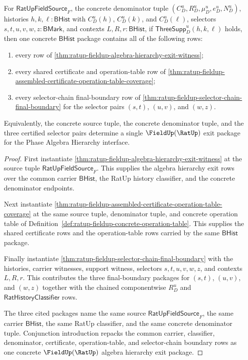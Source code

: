 \begin{theorem}
\label{thm:ratup-fieldup-algebra-hierarchy-selector-chain-exit}
For $\mathsf{RatUpFieldSource}_F$, the concrete denominator tuple
$(C_D^u,R_D^u,\mu_D^u,e_D^u,N_D^u)$, histories
$h,k,\ell:\mathsf{BHist}$ with $C_D^u(h)$, $C_D^u(k)$, and $C_D^u(\ell)$,
selectors $s,t,u,v,w,z:\mathsf{BMark}$, and contexts
$L,R,r:\mathsf{BHist}$, if $\mathsf{ThreeSupp}_D^u(h,k,\ell)$ holds, then one
concrete $\mathsf{BHist}$ package contains all of the following rows:
\begin{enumerate}
  \item every row of
  \autoref{thm:ratup-fieldup-algebra-hierarchy-exit-witness};
  \item every shared certificate and operation-table row of
  \autoref{thm:ratup-fieldup-assembled-certificate-operation-table-coverage};
  \item every selector-chain final-boundary row of
  \autoref{thm:ratup-fieldup-selector-chain-final-boundary} for the selector
  pairs $(s,t)$, $(u,v)$, and $(w,z)$.
\end{enumerate}
Equivalently, the concrete source tuple, the concrete denominator tuple, and
the three certified selector pairs determine a single
$\FieldUp(\RatUp)$ exit package for the Phase Algebra Hierarchy interface.
\end{theorem}
\begin{proof}
First instantiate
\autoref{thm:ratup-fieldup-algebra-hierarchy-exit-witness} at the source tuple
$\mathsf{RatUpFieldSource}_F$. This supplies the algebra hierarchy exit rows
over the common carrier $\mathsf{BHist}$, the RatUp history classifier, and the
concrete denominator endpoints.

Next instantiate
\autoref{thm:ratup-fieldup-assembled-certificate-operation-table-coverage} at
the same source tuple, denominator tuple, and concrete operation table of
Definition~\ref{def:ratup-fieldup-concrete-operation-table}. This supplies the
shared certificate rows and the operation-table rows carried by the same
$\mathsf{BHist}$ package.

Finally instantiate \autoref{thm:ratup-fieldup-selector-chain-final-boundary}
with the histories, carrier witnesses, support witness, selectors
$s,t,u,v,w,z$, and contexts $L,R,r$. This contributes the three final-boundary
packages for $(s,t)$, $(u,v)$, and $(w,z)$ together with the chained
componentwise $R_D^u$ and $\mathsf{RatHistoryClassifier}$ rows.

The three cited packages name the same source
$\mathsf{RatUpFieldSource}_F$, the same carrier $\mathsf{BHist}$, the same
RatUp classifier, and the same concrete denominator tuple. Conjunction
introduction repacks the common carrier, classifier, denominator, certificate,
operation-table, and selector-chain boundary rows as one concrete
$\FieldUp(\RatUp)$ algebra hierarchy exit package.
\end{proof}

